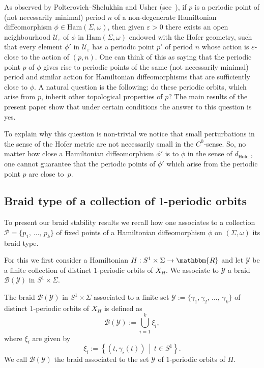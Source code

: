 \documentclass[AHL,Unicode,longabstracts,published]{cedram}
\newcommand{\R}{\mathbbm{R}}
\newcommand{\Ham}{\mathrm{Ham}}
\newcommand{\hofer}{\mathrm{Hofer}}
\newcommand{\clP}{\mathcal{P}}
\newcommand{\clY}{\mathcal{Y}}
\newcommand{\clU}{\mathcal{U}}
\newcommand{\clB}{\mathcal{B}}
\newcommand{\hofer}{\mathrm{Hofer}}
\begin{document}
As observed by Polterovich--Shelukhin and Usher (see~\cite{PolterovichShelukhin2016,Usher}), if $p$ is a periodic point of (not necessarily minimal) period $n$ of a non-degenerate Hamiltonian diffeomorphism $\phi \in \Ham(\Sigma,\omega)$, then given $\varepsilon>0$ there exists an open neighbourhood $\clU_\varepsilon$ of $\phi$ in $\Ham(\Sigma,\omega)$ endowed with the Hofer geometry, such that every element $\phi'$ in $\clU_\varepsilon$ has a periodic point $p'$ of period $n$ whose action is $\varepsilon$-close to the action of $(p,n)$. One can think of this as saying that the periodic point $p$ of $\phi$ gives rise to periodic points of the same (not necessarily minimal) period and similar action for Hamiltonian diffeomorphisms that are sufficiently close to $\phi$. A natural question is the following: do these periodic orbits, which arise from $p$, inherit other topological properties of $p$? The main results of the present paper show that under certain conditions the answer to this question is yes.

To explain why this question is non-trivial we notice that small perturbations in the sense of the Hofer metric are not necessarily small in the $C^0$-sense. So, no matter how close a Hamiltonian diffeomorphism $\phi'$ is to $\phi$ in the sense of $d_{\hofer}$, one cannot guarantee that the periodic points of $\phi'$ which arise from the periodic point $p$ are close to~$p$.


\subsection{Braid type of a collection of \texorpdfstring{$1$}{1}-periodic orbits}

To present our braid stability results we recall how one associates to a collection $\clP=\{p_1,\,\ldots,\,p_k\}$ of fixed points of a Hamiltonian diffeomorphism $\phi$ on $(\Sigma,\omega)$ its braid type.

For this we first consider a Hamiltonian $H:S^1 \times \Sigma \to \R$ and let $\clY$ be a finite collection of distinct $1$-periodic orbits of $X_H$. We associate to $\clY$ a braid $\clB(\clY)$ in $S^1 \times \Sigma$.

\begin{defi} \label{def:braid}
The braid $\clB(\clY)$ in $S^1 \times \Sigma$ associated to a finite set $\clY:= \{\gamma_1,\gamma_2,\,\ldots,\,\gamma_k\}$ of distinct $1$-periodic orbits of $X_H$ is defined as
\begin{equation}\label{eq:braid}
\clB(\clY) := \bigcup_{i=1}^k \xi_i,
\end{equation}
where $\xi_i$ are given by
\begin{equation}\label{eq:braidcomponents}
\xi_i := \left\{(t,\gamma_i(t)) \, \middle| \, t \in S^1\right\}.
\end{equation}
We call $\clB(\clY)$ the braid associated to the set $\clY$ of $1$-periodic orbits of $H$.
\end{defi}
\end{document}
